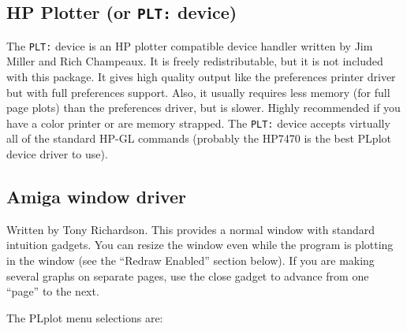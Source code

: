 \subsection{HP Plotter (or {\tt PLT:} device)}

The {\tt PLT:} device is an HP plotter compatible device handler written by
Jim Miller and Rich Champeaux.  It is freely redistributable, but it is not
included with this package.  It gives high quality output like the
preferences printer driver but with full preferences support.  Also, it
usually requires less memory (for full page plots) than the preferences
driver, but is slower.  Highly recommended if you have a color printer or
are memory strapped.  The {\tt PLT:} device accepts virtually all of the
standard HP-GL commands (probably the HP7470 is the best PLplot device
driver to use).

\subsection{Amiga window driver}

Written by Tony Richardson.  This provides a normal window with standard
intuition gadgets.  You can resize the window even while the program is
plotting in the window (see the ``Redraw Enabled'' section below).  If you
are making several graphs on separate pages, use the close gadget to
advance from one ``page'' to the next. 

The PLplot menu selections are:

